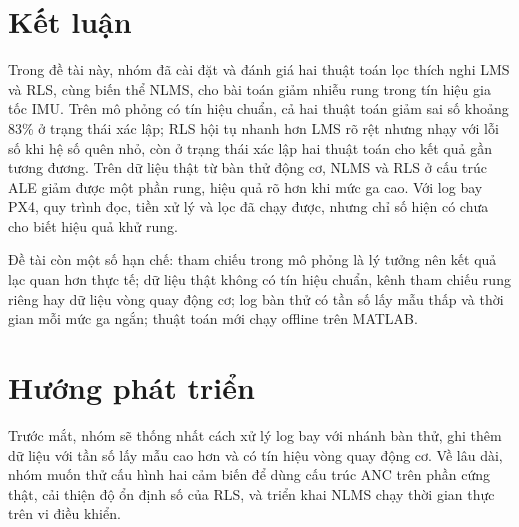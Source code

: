 \documentclass[../main.tex]{subfiles}
\begin{document}
\section{Kết luận}

Trong đề tài này, nhóm đã cài đặt và đánh giá hai thuật toán lọc thích nghi LMS và RLS, cùng biến thể NLMS, cho bài toán giảm nhiễu rung trong tín hiệu gia tốc IMU. Trên mô phỏng có tín hiệu chuẩn, cả hai thuật toán giảm sai số khoảng 83\% ở trạng thái xác lập; RLS hội tụ nhanh hơn LMS rõ rệt nhưng nhạy với lỗi số khi hệ số quên nhỏ, còn ở trạng thái xác lập hai thuật toán cho kết quả gần tương đương. Trên dữ liệu thật từ bàn thử động cơ, NLMS và RLS ở cấu trúc ALE giảm được một phần rung, hiệu quả rõ hơn khi mức ga cao. Với log bay PX4, quy trình đọc, tiền xử lý và lọc đã chạy được, nhưng chỉ số hiện có chưa cho biết hiệu quả khử rung.

Đề tài còn một số hạn chế: tham chiếu trong mô phỏng là lý tưởng nên kết quả lạc quan hơn thực tế; dữ liệu thật không có tín hiệu chuẩn, kênh tham chiếu rung riêng hay dữ liệu vòng quay động cơ; log bàn thử có tần số lấy mẫu thấp và thời gian mỗi mức ga ngắn; thuật toán mới chạy offline trên MATLAB.

\section{Hướng phát triển}

Trước mắt, nhóm sẽ thống nhất cách xử lý log bay với nhánh bàn thử, ghi thêm dữ liệu với tần số lấy mẫu cao hơn và có tín hiệu vòng quay động cơ. Về lâu dài, nhóm muốn thử cấu hình hai cảm biến để dùng cấu trúc ANC trên phần cứng thật, cải thiện độ ổn định số của RLS, và triển khai NLMS chạy thời gian thực trên vi điều khiển.
\end{document}
